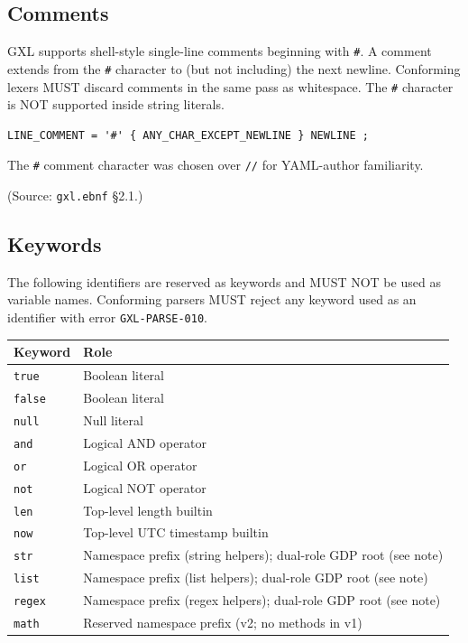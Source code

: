 \subsection{Comments}
\label{subsec:gxl:comments}

GXL supports shell-style single-line comments beginning with \texttt{\#}.
A comment extends from the \texttt{\#} character to (but not including)
the next newline.
Conforming lexers MUST discard comments in the same pass as whitespace.
The \texttt{\#} character is NOT supported inside string literals.

\begin{verbatim}
LINE_COMMENT = '#' { ANY_CHAR_EXCEPT_NEWLINE } NEWLINE ;
\end{verbatim}

The \texttt{\#} comment character was chosen over \texttt{//}
for YAML-author familiarity.

(Source: \texttt{gxl.ebnf} \S2.1.)

\subsection{Keywords}
\label{subsec:gxl:keywords}

The following identifiers are reserved as keywords and MUST NOT be used as
variable names.  Conforming parsers MUST reject any keyword used as an
identifier with error \texttt{GXL-PARSE-010}.

\begin{center}
\begin{tabular}{ll}
\hline
\textbf{Keyword} & \textbf{Role} \\
\hline
\texttt{true}   & Boolean literal \\
\texttt{false}  & Boolean literal \\
\texttt{null}   & Null literal \\
\texttt{and}    & Logical AND operator \\
\texttt{or}     & Logical OR operator \\
\texttt{not}    & Logical NOT operator \\
\texttt{len}    & Top-level length builtin \\
\texttt{now}    & Top-level UTC timestamp builtin \\
\texttt{str}    & Namespace prefix (string helpers); dual-role GDP root (see note) \\
\texttt{list}   & Namespace prefix (list helpers); dual-role GDP root (see note) \\
\texttt{regex}  & Namespace prefix (regex helpers); dual-role GDP root (see note) \\
\texttt{math}   & Reserved namespace prefix (v2; no methods in v1) \\
\hline
\end{tabular}
\end{center}

